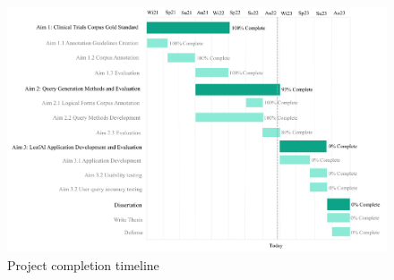 \documentclass[../main.tex]{subfiles}
\begin{document}
\begin{figure}[h]
  \includegraphics[scale=0.66]{Figures/timeline.pdf} 
\caption{Project completion timeline}
\label{timeline}
\end{figure}
\end{document}
